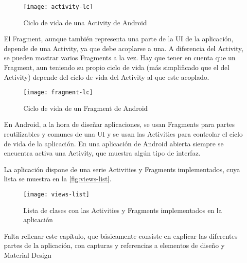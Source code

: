 \begin{figure}[H]
	\centering
	\texttt{[image: activity-lc]}
	\caption{Ciclo de vida de una Activity de Android}
	\label{fig:activity-lc}
\end{figure}

El Fragment, aunque también representa una parte de la UI de la aplicación, depende de una Activity, ya que debe acoplarse a una. A diferencia del Activity, se pueden mostrar varios Fragments a la vez. Hay que tener en cuenta que un Fragment, aun teniendo su propio ciclo de vida (más simplificado que el del Activity) depende del ciclo de vida del Activity al que este acoplado. 

\begin{figure}[H]
	\centering
	\texttt{[image: fragment-lc]}
	\caption{Ciclo de vida de un Fragment de Android}
	\label{fig:fragment-lc}
\end{figure}


En Android, a la hora de diseñar aplicaciones, se usan Fragments para partes reutilizables y comunes de una UI y se usan las Activities para controlar el ciclo de vida de la aplicación. En una aplicación de Android abierta siempre se encuentra activa una Activity, que muestra algún tipo de interfaz.

La aplicación dispone de una serie Activities y Fragments implementados, cuya lista se muestra en la \autoref{fig:views-list}.

\begin{figure}[H]
	\centering
	\texttt{[image: views-list]}
	\caption{Lista de clases con las Activities y Fragments implementados en la aplicación}
	\label{fig:views-list}
\end{figure}


{\color{red} Falta rellenar este capítulo, que básicamente consiste en explicar las diferentes partes de la aplicación, con capturas y referencias a elementos de diseño y Material Design}